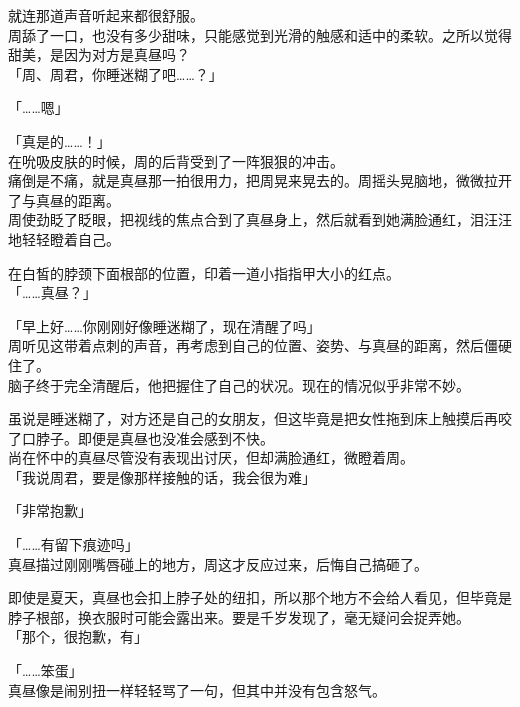 就连那道声音听起来都很舒服。\\

周舔了一口，也没有多少甜味，只能感觉到光滑的触感和适中的柔软。之所以觉得甜美，是因为对方是真昼吗？\\

「周、周君，你睡迷糊了吧……？」

「……嗯」

「真是的……！」\\

在吮吸皮肤的时候，周的后背受到了一阵狠狠的冲击。\\

痛倒是不痛，就是真昼那一拍很用力，把周晃来晃去的。周摇头晃脑地，微微拉开了与真昼的距离。\\

周使劲眨了眨眼，把视线的焦点合到了真昼身上，然后就看到她满脸通红，泪汪汪地轻轻瞪着自己。

在白皙的脖颈下面根部的位置，印着一道小指指甲大小的红点。\\

「……真昼？」

「早上好……你刚刚好像睡迷糊了，现在清醒了吗」\\

周听见这带着点刺的声音，再考虑到自己的位置、姿势、与真昼的距离，然后僵硬住了。\\

脑子终于完全清醒后，他把握住了自己的状况。现在的情况似乎非常不妙。

虽说是睡迷糊了，对方还是自己的女朋友，但这毕竟是把女性拖到床上触摸后再咬了口脖子。即便是真昼也没准会感到不快。\\

尚在怀中的真昼尽管没有表现出讨厌，但却满脸通红，微瞪着周。\\

「我说周君，要是像那样接触的话，我会很为难」

「非常抱歉」

「……有留下痕迹吗」\\

真昼描过刚刚嘴唇碰上的地方，周这才反应过来，后悔自己搞砸了。

即使是夏天，真昼也会扣上脖子处的纽扣，所以那个地方不会给人看见，但毕竟是脖子根部，换衣服时可能会露出来。要是千岁发现了，毫无疑问会捉弄她。\\

「那个，很抱歉，有」

「……笨蛋」\\

真昼像是闹别扭一样轻轻骂了一句，但其中并没有包含怒气。\\

